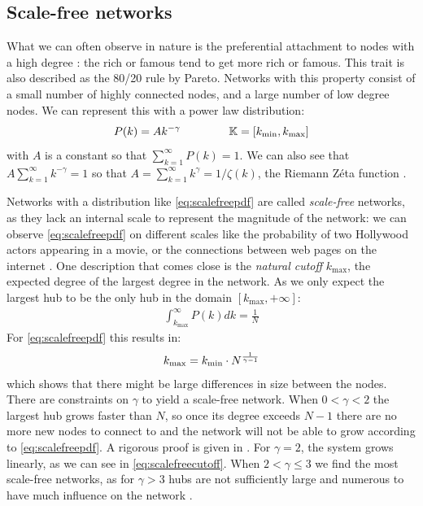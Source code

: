 \subsection{Scale-free networks}
What we can often observe in nature is the preferential attachment to nodes with a high degree \cite{Bullmore2010}: the rich or famous tend to get more rich or famous. This trait is also described as the 80/20 rule by Pareto. Networks with this property consist of a small number of highly connected nodes, and a large number of low degree nodes. We can represent this with a power law distribution:
\begin{align}
P(k) = A k^{-\gamma} \hspace{15mm} \K = [\kmin, \kmax] \label{eq:scalefreepdf}
\end{align}
with $A$ is a constant so that $\sum_{k=1}^{\infty} P(k) = 1$. We can also see that $A \sum_{k=1}^{\infty} k^{-\gamma} = 1$ so that $A = \sum_{k=1}^{\infty} k^{\gamma} = 1/\zeta(k)$, the Riemann Z{\'e}ta function \cite{BarabasiNetworkBook2016}. 

Networks with a distribution like \eqref{eq:scalefreepdf} are called \textit{scale-free} networks, as they lack an internal scale to represent the magnitude of the network: we can observe \eqref{eq:scalefreepdf} on different scales like the probability of two Hollywood actors appearing in a movie, or the connections between web pages on the internet \cite{Barabasi2003}. One description that comes close is the \textit{natural cutoff} $k_{\text{max}}$, the expected degree of the largest degree in the network. As we only expect the largest hub to be the only hub in the domain $[k_{\text{max}}, +\infty]$:
\begin{align*}
\int_{k_{\text{max}}}^{\infty} P(k) dk=\frac{1}{N}
\end{align*}
For \eqref{eq:scalefreepdf} this results in:
\begin{align}
k_{\text{max}} = k_{\text{min}} \cdot N^{\frac{1}{\gamma-1}} \label{eq:scalefreecutoff}
\end{align}
which shows that there might be large differences in size between the nodes. \\
There are constraints on $\gamma$ to yield a scale-free network. When $0 < \gamma < 2$ the largest hub grows faster than $N$, so once its degree exceeds $N-1$ there are no more new nodes to connect to and the network will not be able to grow according to \eqref{eq:scalefreepdf}. A rigorous proof is given in \cite{Bassler2011}. For $\gamma = 2$, the system grows linearly, as we can see in \eqref{eq:scalefreecutoff}. When $2 < \gamma \leq 3$ we find the most scale-free networks, as for $\gamma > 3$ hubs are not sufficiently large and numerous to have much influence on the network
\cite{BarabasiNetworkBook2016}.

